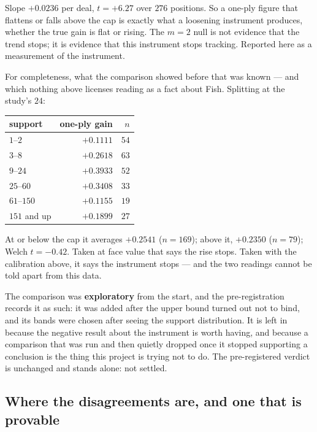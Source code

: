 \documentclass[11pt,a4paper]{article}
\begin{document}
Slope $+0.0236$ per deal, $t = \mathbf{+6.27}$ over $276$ positions. So a
one-ply figure that flattens or falls above the cap is exactly what a
loosening instrument produces, whether the true gain is flat or rising. The
$m = 2$ null is not evidence that the trend stops; it is evidence that this
instrument stops tracking. Reported here as a measurement of the instrument.

For completeness, what the comparison showed before that was known --- and
which nothing above licenses reading as a fact about Fish. Splitting at the
study's $24$:

\begin{center}
\begin{tabular}{lrr}
\toprule
support & one-ply gain & $n$ \\
\midrule
$1$--$2$      & $+0.1111$ & $54$ \\
$3$--$8$      & $+0.2618$ & $63$ \\
$9$--$24$     & $+0.3933$ & $52$ \\
$25$--$60$    & $+0.3408$ & $33$ \\
$61$--$150$   & $+0.1155$ & $19$ \\
$151$ and up  & $+0.1899$ & $27$ \\
\bottomrule
\end{tabular}
\end{center}

At or below the cap it averages $+0.2541$ ($n = 169$); above it, $+0.2350$
($n = 79$); Welch $t = -0.42$. Taken at face value that says the rise stops.
Taken with the calibration above, it says the instrument stops --- and the two
readings cannot be told apart from this data.

The comparison was \textbf{exploratory} from the start, and the
pre-registration records it as such: it was added after the upper bound turned
out not to bind, and its bands were chosen after seeing the support
distribution. It is left in because the negative result about the instrument is
worth having, and because a comparison that was run and then quietly dropped
once it stopped supporting a conclusion is the thing this project is trying not
to do. The pre-registered verdict is unchanged and stands alone: not settled.

\subsection{Where the disagreements are, and one that is provable}
\label{sec:iidiff}
\end{document}
